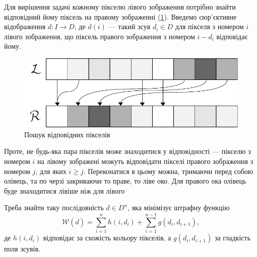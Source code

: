 Для вирішення задачі кожному пікселю лівого зображення потрібно знайти відповідний йому піксель на правому зображенні (\ref{mapping}). Введемо сюр'єктивне відображення $ d : I \rightarrow D $, де $ d(i) $ --- такий зсув $ d_i \in D$ для пікселя з номером $i$ лівого зображення, що піксель правого зображення  з номером $i - d_i$ відповідає йому.
\begin{figure}[h!]
	\centering
	\includegraphics[scale = 1]{mapping.pdf}
	\caption{Пошук відповідних пікселів}
	\label{mapping}
\end{figure}
Проте, не будь-яка пара пікселів може знаходитися у відповідності --- пікселю з номером $i$ на лівому зображені можуть відповідати пікселі  правого зображення з номером $j$, для яких $i \geq j$. Переконатися в цьому можна, тримаючи перед собою олівець, та по черзі закриваючи то праве, то ліве око. Для правого ока олівець буде знаходитися лівіше ніж для лівого

Треба знайти таку послідовність $\overline{d} \in {D}^n$, яка мінімізує штрафну функцію
\begin{equation}
	\mathcal{W}(\overline{d}) = \sum\limits_{i = 1}^n h(i, d_i) + \sum\limits_{i = 1}^{n-1} g(d_i, d_{i + 1}),
	\label{penalty}
\end{equation}
де $ h(i, d_i) $ відповідає за схожість кольору пікселів, а $ g(d_i, d_{i + 1}) $ за гладкість поля зсувів.


